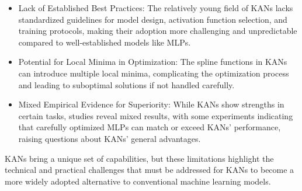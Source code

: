 \begin{itemize}
    \item Lack of Established Best Practices: The relatively young field of KANs lacks standardized guidelines for model design, activation function selection, and training protocols, making their adoption more challenging and unpredictable compared to well-established models like MLPs.
    
    \item Potential for Local Minima in Optimization: The spline functions in KANs can introduce multiple local minima, complicating the optimization process and leading to suboptimal solutions if not handled carefully.
    
    \item Mixed Empirical Evidence for Superiority: While KANs show strengths in certain tasks, studies reveal mixed results, with some experiments indicating that carefully optimized MLPs can match or exceed KANs' performance, raising questions about KANs' general advantages.
\end{itemize}

KANs bring a unique set of capabilities, but these limitations highlight the technical and practical challenges that must be addressed for KANs to become a more widely adopted alternative to conventional machine learning models.